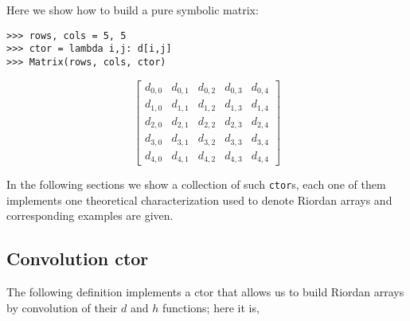 Here we show how to build a pure symbolic matrix:
\begin{verbatim}
>>> rows, cols = 5, 5
>>> ctor = lambda i,j: d[i,j]
>>> Matrix(rows, cols, ctor)
\end{verbatim}
\begin{displaymath}
\left[\begin{matrix}d_{0,0} & d_{0,1} & d_{0,2} & d_{0,3} & d_{0,4}\\d_{1,0} & d_{1,1} & d_{1,2} & d_{1,3} & d_{1,4}\\d_{2,0} & d_{2,1} & d_{2,2} & d_{2,3} & d_{2,4}\\d_{3,0} & d_{3,1} & d_{3,2} & d_{3,3} & d_{3,4}\\d_{4,0} & d_{4,1} & d_{4,2} & d_{4,3} & d_{4,4}\end{matrix}\right]
\end{displaymath}

In the following sections we show a collection of such \verb|ctor|s, each one
of them implements one theoretical characterization used to denote Riordan
arrays and corresponding examples are given.

\subsection{Convolution ctor}

The following definition implements a ctor that allows us to build Riordan
arrays by convolution of their $d$ and $h$ functions; here it is,


